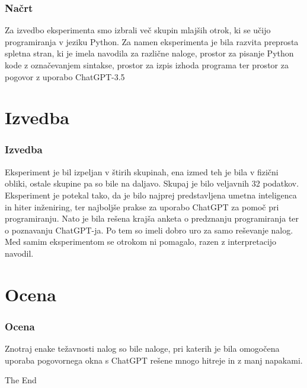 \documentclass{beamer}
\begin{document}

\begin{frame}
\frametitle{Načrt}
Za izvedbo eksperimenta smo izbrali več skupin mlajših otrok, ki se učijo programiranja v jeziku Python. Za namen eksperimenta je bila razvita preprosta spletna stran, ki je imela navodila za različne naloge, prostor za pisanje Python kode z označevanjem sintakse, prostor za izpis izhoda programa ter prostor za pogovor z uporabo ChatGPT-3.5
\end{frame}

\section{Izvedba}
\begin{frame}
\frametitle{Izvedba}
Eksperiment je bil izpeljan v štirih skupinah, ena izmed teh je bila v fizični obliki, ostale skupine pa so bile na daljavo. Skupaj je bilo veljavnih 32 podatkov. Eksperiment je potekal tako, da je bilo najprej predstavljena umetna inteligenca in hiter inženiring, ter najboljše prakse za uporabo ChatGPT za pomoč pri programiranju. Nato je bila rešena krajša anketa o predznanju programiranja ter o poznavanju ChatGPT-ja. Po tem so imeli dobro uro za samo reševanje nalog. Med samim eksperimentom se otrokom ni pomagalo, razen z interpretacijo navodil.
\end{frame}

\section{Ocena}
\begin{frame}
\frametitle{Ocena}
Znotraj enake težavnosti nalog so bile naloge, pri katerih je bila omogočena uporaba pogovornega okna s ChatGPT rešene mnogo hitreje in z manj napakami. 
\end{frame}


\begin{frame}
\Huge{\centerline{The End}}
\end{frame}

\end{document}
